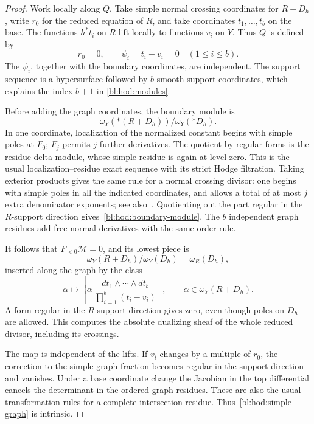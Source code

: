 \begin{proof}
Work locally along $Q$. Take simple normal crossing coordinates
for $R+D_h$, write $r_0$ for the reduced equation of $R$, and take
coordinates $t_1,\ldots,t_b$ on the base. The functions $h^*t_i$ on
$R$ lift locally to functions $v_i$ on $Y$. Thus $Q$ is defined by
\[
 r_0=0,\qquad \psi_i=t_i-v_i=0\quad(1\leq i\leq b).
\]
The $\psi_i$, together with the boundary coordinates, are independent.
The support sequence is a hypersurface followed by $b$ smooth
support coordinates, which explains the index $b+1$ in
\eqref{bl:hod:modules}.

Before adding the graph coordinates, the boundary module is
\begin{equation}\label{bl:hod:boundary-module}
 \omega_Y(*(R+D_h))/\omega_Y(*D_h).
\end{equation}
In one coordinate, localization of the normalized constant begins
with simple poles at $F_0$; $F_j$ permits $j$ further derivatives.
The quotient by regular forms is the residue delta module, whose
simple residue is again at level zero. This is the usual
localization--residue exact sequence with its strict Hodge filtration.
Taking exterior products gives the same rule for a normal crossing
divisor: one begins with simple poles in all the indicated
coordinates, and allows a total of at most $j$ extra denominator
exponents; see also~\cite[Section~3 and Proposition~8.2]{MustataPopa2019}.
Quotienting out the part regular in the $R$-support
direction gives~\eqref{bl:hod:boundary-module}. The $b$ independent
graph residues add free normal derivatives with the same order rule.

It follows that $F_{<0}\mathcal M=0$, and its lowest piece is
\[
 \omega_Y(R+D_h)/\omega_Y(D_h)=\omega_R(D_h),
\]
inserted along the graph by the class
\begin{equation}\label{bl:hod:simple-graph}
 \alpha\longmapsto
 \left[\alpha\,
   \frac{dt_1\wedge\cdots\wedge dt_b}
        {\prod_{i=1}^b(t_i-v_i)}\right],
 \qquad \alpha\in\omega_Y(R+D_h).
\end{equation}
A form regular in the $R$-support direction gives zero, even though
poles on $D_h$ are allowed. This computes the absolute dualizing
sheaf of the whole reduced divisor, including its crossings.

The map is independent of the lifts. If $v_i$ changes by a multiple
of $r_0$, the correction to the simple graph fraction becomes
regular in the support direction and vanishes. Under a base
coordinate change the Jacobian in the top differential cancels
the determinant in the ordered graph residues. These are also the
usual transformation rules for a complete-intersection residue.
Thus~\eqref{bl:hod:simple-graph} is intrinsic.


\end{proof}
